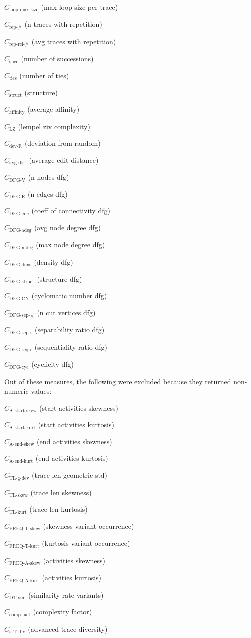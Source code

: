 \documentclass[a4paper]{article}
\newcommand{\startskewname}{\text{A-start-skew}}
\newcommand{\startskew}{C_{\startskewname}}
\newcommand{\startkurtname}{\text{A-start-kurt}}
\newcommand{\startkurt}{C_{\startkurtname}}
\newcommand{\lastskewname}{\text{A-end-skew}}
\newcommand{\lastskew}{C_{\lastskewname}}
\newcommand{\lastkurtname}{\text{A-end-kurt}}
\newcommand{\lastkurt}{C_{\lastkurtname}}
\newcommand{\tlgdevname}{\text{TL-g-dev}}
\newcommand{\tlgdev}{C_{\tlgdevname}}
\newcommand{\tlskewnessname}{\text{TL-skew}}
\newcommand{\tlskewness}{C_{\tlskewnessname}}
\newcommand{\tlkurtosisname}{\text{TL-kurt}}
\newcommand{\tlkurtosis}{C_{\tlkurtosisname}}
\newcommand{\freqskewname}{\text{FREQ-T-skew}}
\newcommand{\freqskew}{C_{\freqskewname}}
\newcommand{\freqkurtname}{\text{FREQ-T-kurt}}
\newcommand{\freqkurt}{C_{\freqkurtname}}
\newcommand{\actfreqskewname}{\text{FREQ-A-skew}}
\newcommand{\actfreqskew}{C_{\actfreqskewname}}
\newcommand{\actfreqkurtname}{\text{FREQ-A-kurt}}
\newcommand{\actfreqkurt}{C_{\actfreqkurtname}}
\newcommand{\dtsimname}{\text{DT-sim}}
\newcommand{\dtsim}{C_{\dtsimname}}
\newcommand{\complexityfactorname}{\text{comp-fact}}
\newcommand{\complexityfactor}{C_{\complexityfactorname}}
\newcommand{\advtracedivname}{\text{a-T-div}}
\newcommand{\advtracediv}{C_{\advtracedivname}}
\newcommand{\loopmaxsizename}{\text{loop-max-size}}
\newcommand{\loopmaxsize}{C_{\loopmaxsizename}}
\newcommand{\repnumname}{\text{rep-\#}}
\newcommand{\repnum}{C_{\repnumname}}
\newcommand{\reprelnumname}{\text{rep-rel-\#}}
\newcommand{\reprelnum}{C_{\reprelnumname}}
\newcommand{\dfgnodesname}{\text{DFG-V}}
\newcommand{\dfgnodes}{C_{\dfgnodesname}}
\newcommand{\dfgedgesname}{\text{DFG-E}}
\newcommand{\dfgedges}{C_{\dfgedgesname}}
\newcommand{\dfgcncname}{\text{DFG-cnc}}
\newcommand{\dfgcnc}{C_{\dfgcncname}}
\newcommand{\dfgavgdegname}{\text{DFG-adeg}}
\newcommand{\dfgavgdeg}{C_{\dfgavgdegname}}
\newcommand{\dfgmaxdegname}{\text{DFG-mdeg}}
\newcommand{\dfgmaxdeg}{C_{\dfgmaxdegname}}
\newcommand{\dfgdensname}{\text{DFG-dens}}
\newcommand{\dfgdens}{C_{\dfgdensname}}
\newcommand{\dfgstructname}{\text{DFG-struct}}
\newcommand{\dfgstruct}{C_{\dfgstructname}}
\newcommand{\dfgcycnumbername}{\text{DFG-CN}}
\newcommand{\dfgcycnumber}{C_{\dfgcycnumbername}}
\newcommand{\dfgsepnumname}{\text{DFG-sep-\#}}
\newcommand{\dfgsepnum}{C_{\dfgsepnumname}}
\newcommand{\dfgseprationame}{\text{DFG-sep-r}}
\newcommand{\dfgsepratio}{C_{\dfgseprationame}}
\newcommand{\dfgseqrationame}{\text{DFG-seq-r}}
\newcommand{\dfgseqratio}{C_{\dfgseqrationame}}
\newcommand{\dfgcycname}{\text{DFG-cyc}}
\newcommand{\dfgcyc}{C_{\dfgcycname}}
\newcommand{\numberofneighborhoodsname}{\text{succ}}
\newcommand{\numberofneighborhoods}{C_{\numberofneighborhoodsname}}
\newcommand{\numberoftiesname}{\text{ties}}
\newcommand{\numberofties}{C_{\numberoftiesname}}
\newcommand{\lempelzivname}{\text{LZ}}
\newcommand{\lempelziv}{C_{\lempelzivname}}
\newcommand{\structurename}{\text{struct}}
\newcommand{\structure}{C_{\structurename}}
\newcommand{\affinityname}{\text{affinity}}
\newcommand{\affinity}{C_{\affinityname}}
\newcommand{\deviationfromrandomname}{\text{dev-R}}
\newcommand{\deviationfromrandom}{C_{\deviationfromrandomname}}
\newcommand{\avgdistname}{\text{avg-dist}}
\newcommand{\avgdist}{C_{\avgdistname}}
\begin{document}
\begin{compactenum}
\item $\loopmaxsize$ (max loop size per trace)
\item $\repnum$ (n traces with repetition)
\item $\reprelnum$ (avg traces with repetition)
\item $\numberofneighborhoods$ (number of successions)
\item $\numberofties$ (number of ties)
\item $\structure$ (structure)
\item $\affinity$ (average affinity)
\item $\lempelziv$ (lempel ziv complexity)
\item $\deviationfromrandom$ (deviation from random)
\item $\avgdist$ (average edit distance)
\item $\dfgnodes$ (n nodes dfg)
\item $\dfgedges$ (n edges dfg)
\item $\dfgcnc$ (coeff of connectivity dfg)
\item $\dfgavgdeg$ (avg node degree dfg)
\item $\dfgmaxdeg$ (max node degree dfg)
\item $\dfgdens$ (density dfg)
\item $\dfgstruct$ (structure dfg)
\item $\dfgcycnumber$ (cyclomatic number dfg)
\item $\dfgsepnum$ (n cut vertices dfg)
\item $\dfgsepratio$ (separability ratio dfg)
\item $\dfgseqratio$ (sequentiality ratio dfg)
\item $\dfgcyc$ (cyclicity dfg)
\end{compactenum}

\bigskip
\noindent
Out of these measures, the following were excluded because they returned non-numeric values:
\begin{compactenum}
\item $\startskew$ (start activities skewness)
\item $\startkurt$ (start activities kurtosis)
\item $\lastskew$ (end activities skewness)
\item $\lastkurt$ (end activities kurtosis)
\item $\tlgdev$ (trace len geometric std)
\item $\tlskewness$ (trace len skewness)
\item $\tlkurtosis$ (trace len kurtosis)
\item $\freqskew$ (skewness variant occurrence)
\item $\freqkurt$ (kurtosis variant occurrence)
\item $\actfreqskew$ (activities skewness)
\item $\actfreqkurt$ (activities kurtosis)
\item $\dtsim$ (similarity rate variants)
\item $\complexityfactor$ (complexity factor)
\item $\advtracediv$ (advanced trace diversity)
\end{compactenum}
\end{document}

